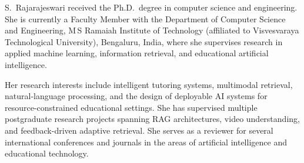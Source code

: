 \documentclass[journal]{IEEEtran}
\begin{document}
\begin{IEEEbiographynophoto}{S.~Rajarajeswari}
received the Ph.D.~degree in computer science and engineering.  She
is currently a Faculty Member with the Department of Computer Science
and Engineering, M\,S Ramaiah Institute of Technology (affiliated to
Visvesvaraya Technological University), Bengaluru, India, where she
supervises research in applied machine learning, information
retrieval, and educational artificial intelligence.

Her research interests include intelligent tutoring systems,
multimodal retrieval, natural-language processing, and the design of
deployable AI systems for resource-constrained educational settings.
She has supervised multiple postgraduate research projects spanning
RAG architectures, video understanding, and feedback-driven adaptive
retrieval.  She serves as a reviewer for several international
conferences and journals in the areas of artificial intelligence and
educational technology.
\end{IEEEbiographynophoto}
\end{document}
